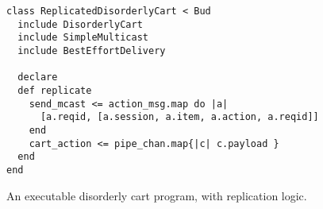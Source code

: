 \begin{figure}[h]
\begin{scriptsize}
\begin{lstlisting}
class ReplicatedDisorderlyCart < Bud
  include DisorderlyCart
  include SimpleMulticast
  include BestEffortDelivery

  declare
  def replicate
    send_mcast <= action_msg.map do |a| 
      [a.reqid, [a.session, a.item, a.action, a.reqid]] 
    end
    cart_action <= pipe_chan.map{|c| c.payload }
  end
end
\end{lstlisting}
\centering
\vspace{-10pt}
\caption{An executable disorderly cart program, with replication logic.}
\label{fig:complete-dis-cart}
\end{scriptsize}
\vspace{-2pt}
\end{figure}
